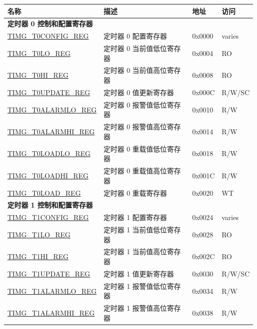 
\begin{longtable}{ | p{6cm} | p{7.2cm} | p{1.3cm} | p{1cm} | }
    \hline\rowcolor{lightgray}
    \textbf{名称} & \textbf{描述} &  \textbf{地址} & \textbf{访问} \\ \hline
    \endhead
    \multicolumn{4}{|l|}{\textbf{定时器 0 控制和配置寄存器}} \\ \hline
    \hyperref[regdesc:TIMGTXCONFIGREG]{TIMG\_T0CONFIG\_REG} & 定时器 0 配置寄存器 & 0x0000 & varies \\ \hline
    \hyperref[regdesc:TIMGTXLOREG]{TIMG\_T0LO\_REG} & 定时器 0 当前值低位寄存器 & 0x0004 & RO \\ \hline
    \hyperref[regdesc:TIMGTXHIREG]{TIMG\_T0HI\_REG} & 定时器 0 当前值高位寄存器 & 0x0008 & RO \\ \hline
    \hyperref[regdesc:TIMGTXUPDATEREG]{TIMG\_T0UPDATE\_REG} & 定时器 0 值更新寄存器 & 0x000C & R/W/SC \\ \hline
    \hyperref[regdesc:TIMGTXALARMLOREG]{TIMG\_T0ALARMLO\_REG} & 定时器 0 报警值低位寄存器 & 0x0010 & R/W \\ \hline
    \hyperref[regdesc:TIMGTXALARMHIREG]{TIMG\_T0ALARMHI\_REG} & 定时器 0 报警值高位寄存器 & 0x0014 & R/W \\ \hline
    \hyperref[regdesc:TIMGTXLOADLOREG]{TIMG\_T0LOADLO\_REG} & 定时器 0 重载值低位寄存器 & 0x0018 & R/W \\ \hline
    \hyperref[regdesc:TIMGTXLOADHIREG]{TIMG\_T0LOADHI\_REG} & 定时器 0 重载值高位寄存器 & 0x001C & R/W \\ \hline
    \hyperref[regdesc:TIMGTXLOADREG]{TIMG\_T0LOAD\_REG} & 定时器 0 重载寄存器 & 0x0020 & WT \\ \hline
    \multicolumn{4}{|l|}{\textbf{定时器 1 控制和配置寄存器}} \\ \hline
    \hyperref[regdesc:TIMGTXCONFIGREG]{TIMG\_T1CONFIG\_REG} & 定时器 1 配置寄存器 & 0x0024 & varies \\ \hline
    \hyperref[regdesc:TIMGTXLOREG]{TIMG\_T1LO\_REG} & 定时器 1 当前值低位寄存器 & 0x0028 & RO \\ \hline
    \hyperref[regdesc:TIMGTXHIREG]{TIMG\_T1HI\_REG} & 定时器 1 当前值高位寄存器 & 0x002C & RO \\ \hline
    \hyperref[regdesc:TIMGTXUPDATEREG]{TIMG\_T1UPDATE\_REG} & 定时器 1 值更新寄存器 & 0x0030 & R/W/SC \\ \hline
    \hyperref[regdesc:TIMGTXALARMLOREG]{TIMG\_T1ALARMLO\_REG} & 定时器 1 报警值低位寄存器 & 0x0034 & R/W \\ \hline
    \hyperref[regdesc:TIMGTXALARMHIREG]{TIMG\_T1ALARMHI\_REG} & 定时器 1 报警值高位寄存器 & 0x0038 & R/W \\ \hline

\end{longtable}
